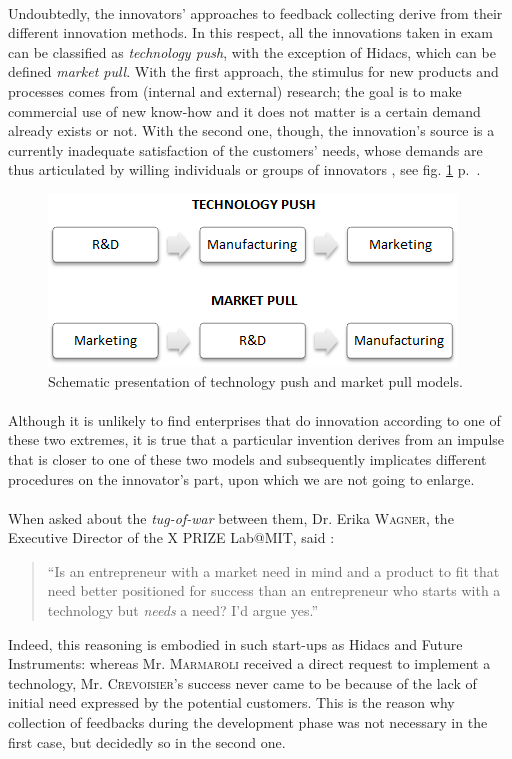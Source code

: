 \documentclass[twoside]{report}
\begin{document}
	\paragraph{}
	Undoubtedly, the innovators' approaches to feedback collecting derive from their different innovation methods. In this respect, all the innovations taken in exam can be classified as \emph{technology push}, with the exception of Hidacs, which can be defined \emph{market pull}. With the first approach, the stimulus for new products and processes comes from (internal and external) research; the goal is to make commercial use of new know-how and it does not matter is a certain demand already exists or not. With the second one, though, the innovation's source is a currently inadequate satisfaction of the customers' needs, whose demands are thus articulated by willing individuals or groups of innovators \cite{brem_integration_2009}, see fig. \ref{fig:models} p.~\pageref{fig:models}.
	\begin{figure}
		\begin{center}
			\includegraphics{techno.png}
			\caption{Schematic presentation of technology push and market pull models.}
			\label{fig:models}
		\end{center}
	\end{figure}
	\paragraph{}
	Although it is unlikely to find enterprises that do innovation according to one of these two extremes, it is true that a particular invention derives from an impulse that is closer to one of these two models and subsequently implicates different procedures on the innovator's part, upon which we are not going to enlarge.
	\paragraph{}
When asked about the \emph{tug-of-war} between them, Dr. Erika \textsc{Wagner}, the Executive Director of the X PRIZE Lab@MIT, said \cite{awolfson_entrepreneurship_2010} : \begin{quote}\enquote{Is an entrepreneur with a market need in mind and a product to fit that need better positioned for success than an entrepreneur who starts with a technology but \emph{needs} a need? I'd argue yes.}\end{quote} Indeed, this reasoning is embodied in such start-ups as Hidacs and Future Instruments: whereas Mr. \textsc{Marmaroli} received a direct request to implement a technology, Mr. \textsc{Crevoisier}'s success never came to be because of the lack of initial need expressed by the potential customers. This is the reason why collection of feedbacks during the development phase was not necessary in the first case, but decidedly so in the second one.
\end{document}
